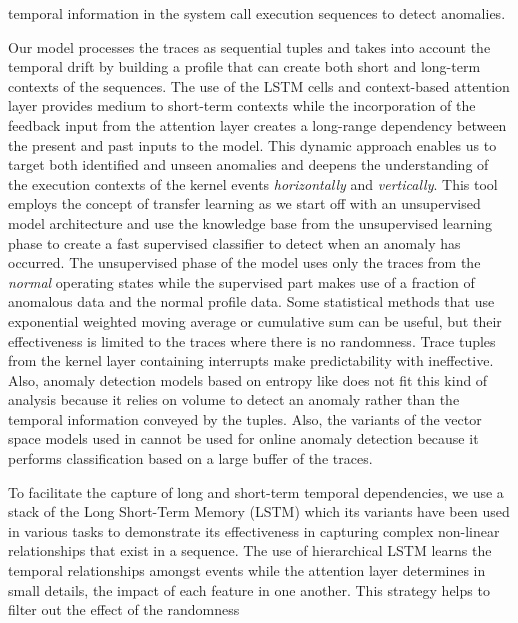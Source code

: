 temporal information in the system call execution sequences to detect 
anomalies.  
\par  
Our model processes the traces as sequential tuples and takes into account the 
temporal drift by building a profile that can create both short and long-term 
contexts of the sequences. The use of the LSTM cells and context-based 
attention layer provides medium to short-term contexts while the incorporation 
of the feedback input from the attention layer creates a long-range dependency 
between the present and past inputs to the model. This dynamic approach enables 
us to target both identified and unseen anomalies and deepens the understanding 
of the execution contexts of the kernel events \emph{horizontally} and 
\emph{vertically}. This tool employs the concept of transfer learning as we 
start off with an unsupervised model architecture and use the knowledge base 
from the unsupervised learning phase to create a fast supervised classifier to 
detect when an anomaly has occurred.  The unsupervised phase of the model uses 
only the traces from the \emph{normal} operating states while the supervised 
part makes use of a fraction of anomalous data and the normal profile data.  
Some statistical methods that use exponential weighted moving average 
\cite{ye2003computer} or cumulative sum \cite{siris2004application} can be 
useful, but their effectiveness is limited to the traces where there is no 
randomness. Trace tuples from the kernel layer containing interrupts make 
predictability with 
\cite{ye2003computer,siris2004application} ineffective. Also, anomaly detection 
models based on entropy like \cite{gu2005detecting} does not fit this kind of 
analysis because it relies on volume to detect an anomaly rather than the 
temporal information conveyed by the tuples. Also, the variants of the vector 
space models used in 
\cite{ezeme2017imputation,xu2009largescale,yoon2017learning} cannot be used for 
online anomaly detection because it performs classification based on a large 
buffer of the traces. \par
To facilitate the capture of long and short-term temporal dependencies, we use 
a stack of the Long Short-Term Memory (LSTM) \cite{hochreiter1997long} which 
its variants have been used in various tasks to demonstrate its effectiveness 
in capturing complex non-linear relationships that exist in a sequence. The use 
of hierarchical LSTM learns the temporal relationships amongst events while the 
attention layer determines in small details, the impact of each feature in one 
another. This strategy helps to filter out the effect of the randomness 
